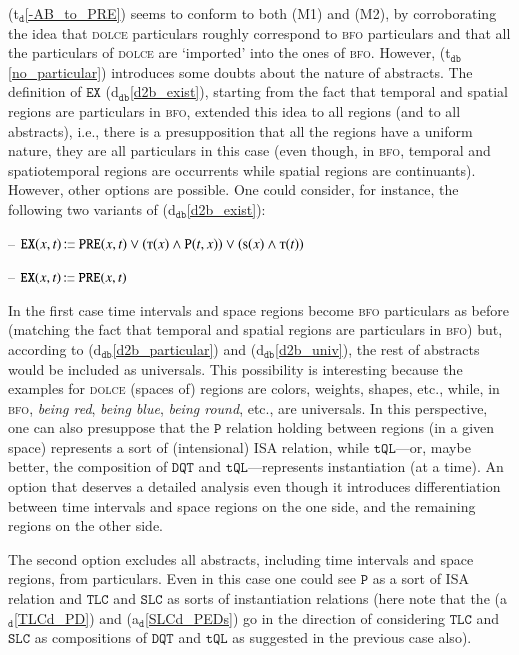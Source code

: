 \documentclass[ao]{iosart2x}
\newcommand{\bflist}{\begin{list}{}{\setlength{\topsep}{2mm}\setlength{\parsep}{0mm}\setlength{\leftmargin}{9.2mm}\setlength{\labelwidth}{8mm}}}
\newcommand{\eflist}{\end{list}}
\newcommand{\dolceAxLabel}{\textrm{a$_\texttt{d}$}}
\newcommand{\dolceThrLabel}{\textrm{t$_\texttt{d}$}}
\newcommand{\dbDefLabel}{\textrm{d$_\texttt{db}$}}
\newcommand{\dbThrLabel}{\textrm{t$_\texttt{db}$}}
\newcommand{\refdolceax}[1]{({\dolceAxLabel}\ref{#1})}
\newcommand{\refdolceth}[1]{({\dolceThrLabel}\ref{#1})}
\newcommand{\refdbdf}[1]{({\dbDefLabel}\ref{#1})}
\newcommand{\refdbth}[1]{({\dbThrLabel}\ref{#1})}
\newcommand{\pr}[1]{\mathtt{#1}}
\newcommand\textequal{%
 \rule[.08ex]{5pt}{0.35pt}\llap{\rule[.78ex]{5pt}{0.35pt}}}
\newcommand{\sdef}{{\hspace{1.5pt}:\hspace{-2.5pt}\textequal\hspace{3pt}}}
\newcommand{\dolce}{{\textsc{dolce}}}
\newcommand{\bfo}{{\textsc{bfo}}}
\newcommand {\Sdcat} {\textsc{s}}
\newcommand {\Tdcat} {\textsc{t}}
\newcommand {\Pd} {\ensuremath{\pr{P}}}
\newcommand {\PREd} {\ensuremath{\pr{PRE}}}
\newcommand {\DQTd} {\ensuremath{\pr{DQT}}}
\newcommand {\TQLd} {\ensuremath{\pr{tQL}}}
\newcommand {\SLCd} {\ensuremath{\pr{SLC}}}
\newcommand {\TLCd} {\ensuremath{\pr{TLC}}}
\newcommand{\bfoexist}{\pr{EX}}
\begin{document}
\refdolceth{-AB_to_PRE} seems to conform to both (M1) and (M2), by corroborating the idea that {\dolce} particulars roughly correspond to {\bfo} particulars and that all the particulars of {\dolce} are `imported' into the ones of {\bfo}. However, \refdbth{no_particular} introduces some doubts about the nature of abstracts. The definition of $\bfoexist$ \refdbdf{d2b_exist}, starting from the fact that temporal and spatial regions are particulars in {\bfo}, extended this idea to all regions (and to all abstracts), i.e., there is a presupposition that all the regions have a uniform nature, they are all particulars in this case (even though, in {\bfo}, temporal and spatiotemporal regions are occurrents while spatial regions are continuants). However, other options are possible. One could consider, for instance, the following two variants of \refdbdf{d2b_exist}:
\bflist
\item[--] $\bfoexist(x,t)\sdef \PREd(x,t) \lor (\Tdcat(x) \land \Pd(t,x)) \lor (\Sdcat(x) \land \Tdcat(t))$
\item[--] $\bfoexist(x,t)\sdef \PREd(x,t)$
\eflist
%
In the first case time intervals and space regions become {\bfo} particulars as before (matching the fact that temporal and spatial regions are particulars in {\bfo}) but, according to \refdbdf{d2b_particular} and \refdbdf{d2b_univ}, the rest of abstracts would be included as universals. This possibility is interesting because the examples for {\dolce} (spaces of) regions are colors, weights, shapes, etc., while, in {\bfo}, \emph{being red}, \emph{being blue}, \emph{being round}, etc., are universals. In this perspective, one can also presuppose that the $\Pd$ relation holding between regions (in a given space) represents a sort of (intensional) ISA relation, while $\TQLd$---or, maybe better, the composition of $\DQTd$ and  $\TQLd$---represents instantiation (at a time). An option that deserves a detailed analysis even though it introduces differentiation between time intervals and space regions on the one side, and the remaining regions on the other side. 

The second option excludes all abstracts, including time intervals and space regions, from particulars. Even in this case one could see $\Pd$ as a sort of ISA relation and $\TLCd$ and $\SLCd$ as sorts of instantiation relations (here note that the \refdolceax{TLCd_PD} and  \refdolceax{SLCd_PEDs} go in the direction of considering $\TLCd$ and $\SLCd$ as compositions of $\DQTd$ and  $\TQLd$ as suggested in the previous case also).
\end{document}
